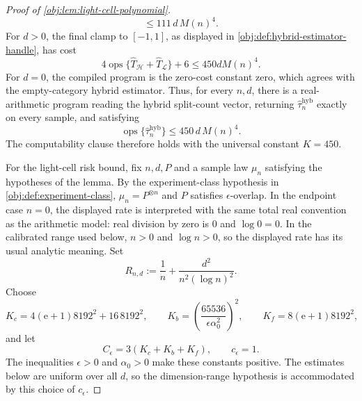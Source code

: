 \documentclass[11pt]{article}
\begin{document}
\begin{proof}[Proof of \cref{obj:lem:light-cell-polynomial}]
\[\le 111\,d\,M(n)^4 .
\]
For \(d>0\), the final clamp to \([-1,1]\), as displayed in \cref{obj:def:hybrid-estimator-handle}, has cost
\[
4\operatorname{ops}\{\widehat T_{\mathcal H}+\widehat T_{\mathcal L}\}+6
\le 450dM(n)^4 .
\]
For \(d=0\), the compiled program is the zero-cost constant zero, which agrees with the empty-category hybrid estimator.  Thus, for every \(n,d\), there is a real-arithmetic program reading the hybrid split-count vector, returning \(\widehat\tau_n^{\mathrm{hyb}}\) exactly on every sample, and satisfying
\[
\operatorname{ops}\{\widehat\tau_n^{\mathrm{hyb}}\}
\le 450\,d\,M(n)^4 .
\] %
The computability clause therefore holds with the universal constant \(K=450\).

For the light-cell risk bound, fix \(n,d,P\) and a sample law \(\mu_n\) satisfying the hypotheses of the lemma.  By the experiment-class hypothesis in \cref{obj:def:experiment-class}, \(\mu_n=P^{\otimes n}\) and \(P\) satisfies \(\epsilon\)-overlap.  In the endpoint case \(n=0\), the displayed rate is interpreted with the same total real convention as the arithmetic model: real division by zero is \(0\) and \(\log 0=0\).  In the calibrated range used below, \(n>0\) and \(\log n>0\), so the displayed rate has its usual analytic meaning.  Set
\[
R_{n,d}:=\frac1n+\frac{d^2}{n^2(\log n)^2}.
\]
Choose
\[
K_c=4(\mathrm e+1)8192^2+16\,8192^2,
\qquad K_b=\left(\frac{65536}{\epsilon\alpha_0^2}\right)^2,
\qquad K_f=8(\mathrm e+1)8192^2,
\]
and let
\[
C_\epsilon=3(K_c+K_b+K_f),\qquad c_\epsilon=1 .
\] %
The inequalities \(\epsilon>0\) and \(\alpha_0>0\) make these constants positive.  The estimates below are uniform over all \(d\), so the dimension-range hypothesis is accommodated by this choice of \(c_\epsilon\).


\end{proof}
\end{document}
